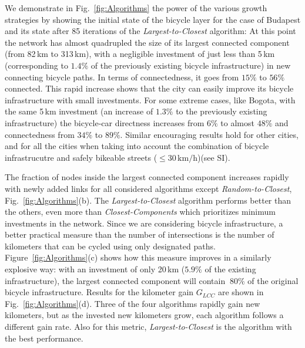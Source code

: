 We demonstrate in Fig.~\ref{fig:Algorithms} the power of the various growth strategies by showing the initial state of the bicycle layer for the case of Budapest and its state after 85 iterations of the \emph{Largest-to-Closest} algorithm: At this point the network has almost quadrupled the size of its largest connected component (from 82\,km to 313\,km), with a negligible investment of just less than 5\,km (corresponding to $1.4\%$ of the previously existing bicycle infrastructure) in new connecting bicycle paths. In terms of connectedness, it goes from $15\%$ to $56\%$ connected. This rapid increase shows that the city can easily improve its bicycle infrastructure with small investments. For some extreme cases, like Bogota, with the same 5\,km investment (an increase of $1.3\%$ to the previously existing infrastructure) the bicycle-car directness increases from $6\%$ to almost $48\%$ and connectedness from $34\%$ to $89\%$. Similar encouraging results hold for other cities, and for all the cities when taking into account the combination of bicycle infrastrucutre and safely bikeable streets ($\leq 30\,\mathrm{km/h}$)(see SI).

The fraction of nodes inside the largest connected component increases rapidly with newly added links for all considered algorithms except \emph{Random-to-Closest}, Fig.~\ref{fig:Algorithms}(b). The \emph{Largest-to-Closest} algorithm performs better than the others, even more than \emph{Closest-Components} which prioritizes minimum investments in the network. Since we are considering bicycle infrastructure, a better practical measure than the number of intersections is the number of kilometers that can be cycled using only designated paths. Figure~\ref{fig:Algorithms}(c) shows how this measure improves in a similarly explosive way: with an investment of only 20\,km ($5.9\%$ of the existing infrastructure), the largest connected component will contain $~80\%$ of the original bicycle infrastructure. Results for the kilometer gain $G_{LCC}$ are shown in Fig.~\ref{fig:Algorithms}(d). Three of the four algorithms rapidly gain new kilometers, but as the invested new kilometers grow, each algorithm follows a different gain rate. Also for this metric, \textit{Largest-to-Closest} is the algorithm with the best performance.

